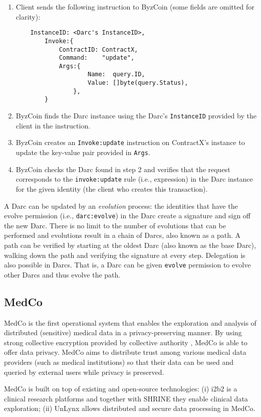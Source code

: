 \begin{enumerate}
    \item Client sends the following instruction to ByzCoin (some fields are omitted for clarity):
    \begin{verbatim}
    InstanceID: <Darc's InstanceID>,
        Invoke:{
            ContractID: ContractX,
            Command:    "update",
            Args:{
                    Name:  query.ID,             
                    Value: []byte(query.Status), 
                },
        }
    \end{verbatim}
    \item ByzCoin finds the Darc instance using the Darc's \texttt{InstanceID} provided by the client in the instruction.
    \item ByzCoin creates an \texttt{Invoke:update} instruction on ContractX's instance to update the key-value pair provided in \texttt{Args}.
    \item ByzCoin checks the Darc found in step 2 and verifies that the request corresponds to the \texttt{invoke:update} rule (i.e., expression) in the Darc instance for the given identity (the client who creates this transaction).
\end{enumerate}

 A Darc can be updated by an \textit{evolution} process: the identities that have the evolve permission (i.e., \texttt{darc:evolve}) in the Darc create a signature and sign off the new Darc. There is no limit to the number of evolutions that can be performed and evolutions result in a chain of Darcs, also known as a path. A path can be verified by starting at the oldest Darc (also known as the base Darc), walking down the path and verifying the signature at every step. Delegation is also possible in Darcs. That is, a Darc can be given \texttt{evolve} permission to evolve other Darcs and thus evolve the path.

\subsection{MedCo}\label{background:medco}

MedCo \cite{raisaro2018medco} is the first operational system that enables the exploration and analysis of distributed (sensitive) medical data in a privacy-preserving manner. By using strong collective encryption provided by collective authority \cite{syta2015certificate}, MedCo is able to offer data privacy. MedCo aims to distribute trust among various medical data providers (such as medical institutions) so that their data can be used and queried by external users while privacy is preserved. 

MedCo is built on top of existing and open-source technologies: (i) i2b2 \cite{murphy2010serving} is a clinical research platforms and together with SHRINE \cite{weber2009shared} they enable clinical data exploration; (ii) UnLynx \cite{froelicher2017unlynx} allows distributed and secure data processing in MedCo. 